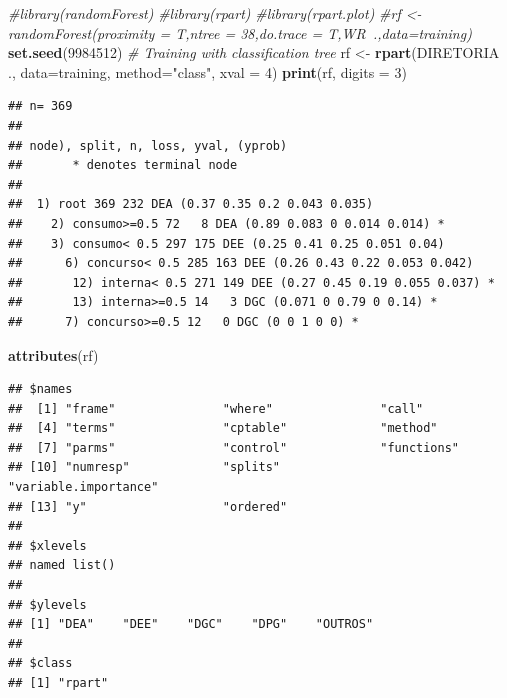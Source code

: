 \documentclass[]{article}
\newenvironment{Shaded}{\begin{snugshade}}{\end{snugshade}}
\newcommand{\KeywordTok}[1]{\textcolor[rgb]{0.13,0.29,0.53}{\textbf{#1}}}
\newcommand{\DataTypeTok}[1]{\textcolor[rgb]{0.13,0.29,0.53}{#1}}
\newcommand{\DecValTok}[1]{\textcolor[rgb]{0.00,0.00,0.81}{#1}}
\newcommand{\StringTok}[1]{\textcolor[rgb]{0.31,0.60,0.02}{#1}}
\newcommand{\CommentTok}[1]{\textcolor[rgb]{0.56,0.35,0.01}{\textit{#1}}}
\newcommand{\OperatorTok}[1]{\textcolor[rgb]{0.81,0.36,0.00}{\textbf{#1}}}
\newcommand{\NormalTok}[1]{#1}
\begin{document}
\begin{Shaded}
\begin{Highlighting}[]
\CommentTok{#library(randomForest)}
\CommentTok{#library(rpart)}
\CommentTok{#library(rpart.plot)}
\CommentTok{#rf <- randomForest(proximity = T,ntree = 38,do.trace = T,WR~.,data=training)}
\KeywordTok{set.seed}\NormalTok{(}\DecValTok{9984512}\NormalTok{)}
\CommentTok{# Training with classification tree}
\NormalTok{rf <-}\StringTok{ }\KeywordTok{rpart}\NormalTok{(DIRETORIA }\OperatorTok{~}\StringTok{ }\NormalTok{., }\DataTypeTok{data=}\NormalTok{training, }\DataTypeTok{method=}\StringTok{"class"}\NormalTok{, }\DataTypeTok{xval =} \DecValTok{4}\NormalTok{)}
\KeywordTok{print}\NormalTok{(rf, }\DataTypeTok{digits =} \DecValTok{3}\NormalTok{)}
\end{Highlighting}
\end{Shaded}

\begin{verbatim}
## n= 369 
## 
## node), split, n, loss, yval, (yprob)
##       * denotes terminal node
## 
##  1) root 369 232 DEA (0.37 0.35 0.2 0.043 0.035)  
##    2) consumo>=0.5 72   8 DEA (0.89 0.083 0 0.014 0.014) *
##    3) consumo< 0.5 297 175 DEE (0.25 0.41 0.25 0.051 0.04)  
##      6) concurso< 0.5 285 163 DEE (0.26 0.43 0.22 0.053 0.042)  
##       12) interna< 0.5 271 149 DEE (0.27 0.45 0.19 0.055 0.037) *
##       13) interna>=0.5 14   3 DGC (0.071 0 0.79 0 0.14) *
##      7) concurso>=0.5 12   0 DGC (0 0 1 0 0) *
\end{verbatim}

\begin{Shaded}
\begin{Highlighting}[]
\KeywordTok{attributes}\NormalTok{(rf)}
\end{Highlighting}
\end{Shaded}

\begin{verbatim}
## $names
##  [1] "frame"               "where"               "call"               
##  [4] "terms"               "cptable"             "method"             
##  [7] "parms"               "control"             "functions"          
## [10] "numresp"             "splits"              "variable.importance"
## [13] "y"                   "ordered"            
## 
## $xlevels
## named list()
## 
## $ylevels
## [1] "DEA"    "DEE"    "DGC"    "DPG"    "OUTROS"
## 
## $class
## [1] "rpart"
\end{verbatim}

\begin{Shaded}
\end{Shaded}
\end{document}
